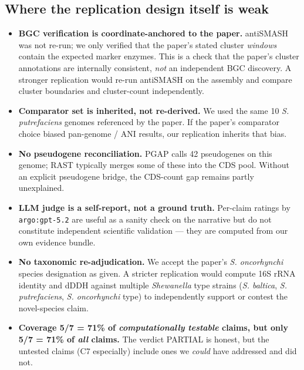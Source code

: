 \documentclass[11pt]{article}
\begin{document}
\subsection*{Where the replication design itself is weak}
\begin{itemize}[leftmargin=*]
  \item \textbf{BGC verification is coordinate-anchored to the paper.} antiSMASH was not re-run; we only verified that the paper's stated cluster \emph{windows} contain the expected marker enzymes. This is a check that the paper's cluster annotations are internally consistent, \emph{not} an independent BGC discovery. A stronger replication would re-run antiSMASH on the assembly and compare cluster boundaries and cluster-count independently.
  \item \textbf{Comparator set is inherited, not re-derived.} We used the same 10 \emph{S. putrefaciens} genomes referenced by the paper. If the paper's comparator choice biased pan-genome / ANI results, our replication inherits that bias.
  \item \textbf{No pseudogene reconciliation.} PGAP calls 42 pseudogenes on this genome; RAST typically merges some of these into the CDS pool. Without an explicit pseudogene bridge, the CDS-count gap remains partly unexplained.
  \item \textbf{LLM judge is a self-report, not a ground truth.} Per-claim ratings by \texttt{argo:gpt-5.2} are useful as a sanity check on the narrative but do not constitute independent scientific validation --- they are computed from our own evidence bundle.
  \item \textbf{No taxonomic re-adjudication.} We accept the paper's \emph{S. oncorhynchi} species designation as given. A stricter replication would compute 16S rRNA identity and dDDH against multiple \emph{Shewanella} type strains (\emph{S. baltica}, \emph{S. putrefaciens}, \emph{S. oncorhynchi} type) to independently support or contest the novel-species claim.
  \item \textbf{Coverage 5/7 = 71\% of \emph{computationally testable} claims, but only 5/7 = 71\% of \emph{all} claims.} The verdict PARTIAL is honest, but the untested claims (C7 especially) include ones we \emph{could} have addressed and did not.
\end{itemize}
\end{document}
